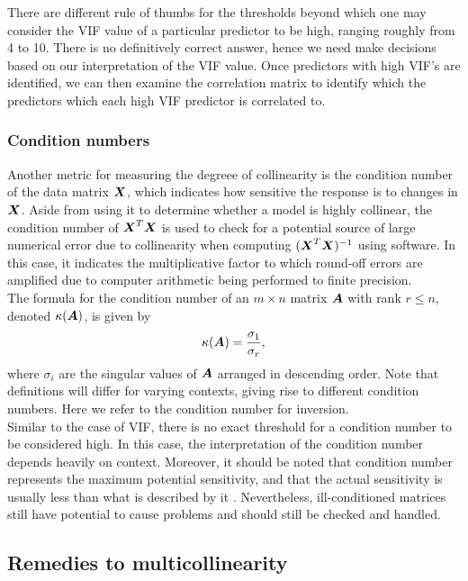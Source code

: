 \documentclass[12pt]{article}
\begin{document}
	There are different rule of thumbs for the thresholds beyond which one may consider the VIF value of a particular predictor to be high, ranging roughly from 4 to 10.\cite{OBrien2007} There is no definitively correct answer, hence we need make decisions based on our interpretation of the VIF value. Once predictors with high VIF's are identified, we can then examine the correlation matrix to identify which the predictors which each high VIF predictor is correlated to.
	
	\subsubsection{Condition numbers}
	Another metric for measuring the degreee of collinearity is the condition number of the data matrix $\boldsymbol{X}$, which indicates how sensitive the response is to changes in $\boldsymbol{X}$. Aside from using it to determine whether a model is highly collinear, the condition number of $\boldsymbol{X}^T\boldsymbol{X}$ is used to check for a potential source of large numerical error due to collinearity when computing $(\boldsymbol{X}^T\boldsymbol{X})^{-1}$ using software. In this case, it indicates the multiplicative factor to which round-off errors are amplified due to computer arithmetic being performed to finite precision.\\
	
	The formula for the condition number of an $m\times n$ matrix $\boldsymbol{A}$ with rank $r\leq n$, denoted $\kappa(\boldsymbol{A})$, is given by
	\begin{equation}
		\kappa(\boldsymbol{A})=\frac{\sigma_1}{\sigma_r},
	\end{equation}
	where $\sigma_i$ are the singular values of $\boldsymbol{A}$ arranged in descending order. Note that definitions will differ for varying contexts, giving rise to different condition numbers. Here we refer to the condition number for inversion.\\
	
	Similar to the case of VIF, there is no exact threshold for a condition number to be considered high. In this case, the interpretation of the condition number depends heavily on context. Moreover, it should be noted that condition number represents the maximum potential sensitivity, and that the actual sensitivity is usually less than what is described by it \cite{Belsley2004}. Nevertheless, ill-conditioned matrices still have potential to cause problems and should still be checked and handled.  
	
	\subsection{Remedies to multicollinearity\label{sec:3.2}}
	
\end{document}
